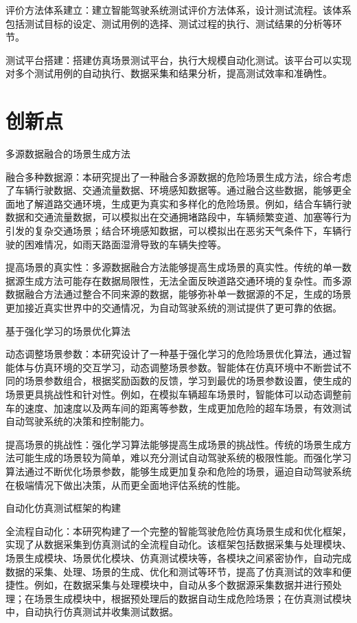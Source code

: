 评价方法体系建立：建立智能驾驶系统测试评价方法体系，设计测试流程。该体系包括测试目标的设定、测试用例的选择、测试过程的执行、测试结果的分析等环节。

测试平台搭建：搭建仿真场景测试平台，执行大规模自动化测试。该平台可以实现对多个测试用例的自动执行、数据采集和结果分析，提高测试效率和准确性。



\section{创新点}

多源数据融合的场景生成方法

融合多种数据源：本研究提出了一种融合多源数据的危险场景生成方法，综合考虑了车辆行驶数据、交通流量数据、环境感知数据等。通过融合这些数据，能够更全面地了解道路交通环境，生成更为真实和多样化的危险场景。例如，结合车辆行驶数据和交通流量数据，可以模拟出在交通拥堵路段中，车辆频繁变道、加塞等行为引发的复杂交通场景；结合环境感知数据，可以模拟出在恶劣天气条件下，车辆行驶的困难情况，如雨天路面湿滑导致的车辆失控等。

提高场景的真实性：多源数据融合方法能够提高生成场景的真实性。传统的单一数据源生成方法可能存在数据局限性，无法全面反映道路交通环境的复杂性。而多源数据融合方法通过整合不同来源的数据，能够弥补单一数据源的不足，生成的场景更加接近真实世界中的交通情况，为自动驾驶系统的测试提供了更可靠的依据。

基于强化学习的场景优化算法

动态调整场景参数：本研究设计了一种基于强化学习的危险场景优化算法，通过智能体与仿真环境的交互学习，动态调整场景参数。智能体在仿真环境中不断尝试不同的场景参数组合，根据奖励函数的反馈，学习到最优的场景参数设置，使生成的场景更具挑战性和针对性。例如，在模拟车辆超车场景时，智能体可以动态调整前车的速度、加速度以及两车间的距离等参数，生成更加危险的超车场景，有效测试自动驾驶系统的决策和控制能力。

提高场景的挑战性：强化学习算法能够提高生成场景的挑战性。传统的场景生成方法可能生成的场景较为简单，难以充分测试自动驾驶系统的极限性能。而强化学习算法通过不断优化场景参数，能够生成更加复杂和危险的场景，逼迫自动驾驶系统在极端情况下做出决策，从而更全面地评估系统的性能。

自动化仿真测试框架的构建

全流程自动化：本研究构建了一个完整的智能驾驶危险仿真场景生成和优化框架，实现了从数据采集到仿真测试的全流程自动化。该框架包括数据采集与处理模块、场景生成模块、场景优化模块、仿真测试模块等，各模块之间紧密协作，自动完成数据的采集、处理、场景的生成、优化和测试等环节，提高了仿真测试的效率和便捷性。例如，在数据采集与处理模块中，自动从多个数据源采集数据并进行预处理；在场景生成模块中，根据预处理后的数据自动生成危险场景；在仿真测试模块中，自动执行仿真测试并收集测试数据。

